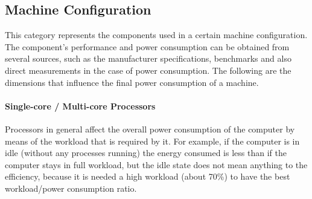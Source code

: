     \subsection{Machine Configuration}\label{sec2:machine_configuration}
        This category represents the components used in a certain machine configuration. The component's performance and power consumption can be obtained from several sources, such as the manufacturer specifications, benchmarks and also direct measurements in the case of power consumption.
        The following are the dimensions that influence the final power consumption of a machine.
            \paragraph*{Single-core / Multi-core Processors} Processors in general affect the overall power consumption of the computer by means of the workload that is required by it. For example, if the computer is in idle (without any processes running) the energy consumed is less than if the computer stays in full workload, but the idle state does not mean anything to the efficiency, because it is needed a high workload (about 70\%) to have the best workload/power consumption ratio.

